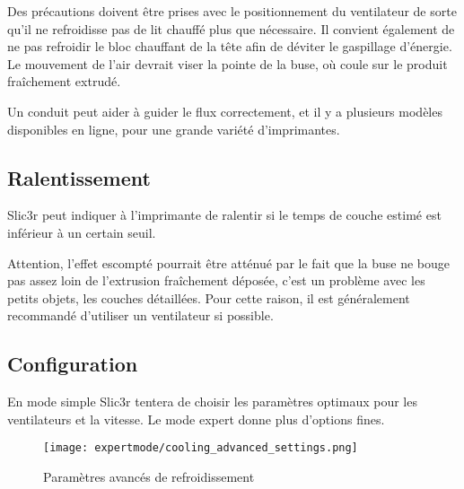 Des pr\'ecautions doivent \^etre prises avec le positionnement du ventilateur de sorte qu'il ne refroidisse pas de lit chauff\'e plus que n\'ecessaire. Il convient \'egalement de ne pas refroidir le bloc chauffant de la t\^ete afin de d\'eviter le gaspillage d'\'energie. Le mouvement de l'air devrait viser la pointe de la buse, o\`u coule sur le produit fra\^ichement extrud\'e.

Un conduit peut aider \`a guider le flux correctement, et il y a plusieurs mod\`eles disponibles en ligne, pour une grande vari\'et\'e d'imprimantes.


\subsection{Ralentissement} %
\label{sub:slowing_down}
Slic3r peut indiquer \`a l'imprimante de ralentir si le temps de couche estim\'e est inf\'erieur \`a un certain seuil.

Attention, l'effet escompt\'e pourrait \^etre att\'enu\'e par le fait que la buse ne bouge pas assez loin de l'extrusion fra\^ichement d\'epos\'ee, c'est un probl\`eme avec les petits objets, les couches d\'etaill\'ees. Pour cette raison, il est g\'en\'eralement recommand\'e d'utiliser un ventilateur si possible.

\subsection{Configuration} %
\label{sub:configuring_cooling}

En mode simple Slic3r tentera de choisir les param\`etres optimaux pour les ventilateurs et la vitesse. Le mode expert donne plus d'options fines.

\begin{figure}[H]
\centering
\texttt{[image: expertmode/cooling\_advanced\_settings.png]}
\caption{Param\`etres avanc\'es de refroidissement}
\label{fig:cooling_advanced_settings}
\end{figure}

